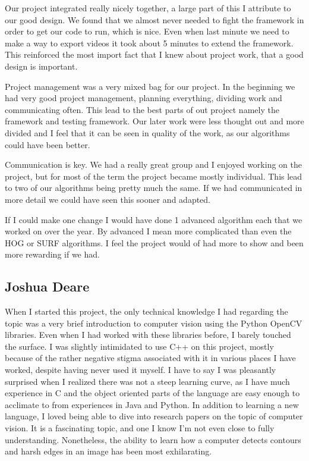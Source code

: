 \documentclass[letterpaper,10pt,titlepage]{article}
\begin{document}
Our project integrated really nicely together, a large part of this I 
attribute to our good design. We found that we almost never needed to
fight the framework in order to get our code to run, which is nice. 
Even when last minute we need to make a way to export videos it took 
about 5 minutes to extend the framework. This reinforced the most 
import fact that I knew about project work, that a good design is 
important.

Project management was a very mixed bag for our project. In the 
beginning we had very good project management, planning everything,
dividing work and communicating often. This lead to the best parts
of out project namely the framework and testing framework. Our later work
were less thought out and more divided and I feel that it can be seen in
quality of the work, as our algorithms could have been better.

Communication is key. We had a really great group and I enjoyed working on the
project, but for most of the term the project became mostly individual. This lead
to two of our algorithms being pretty much the same. If we had communicated in 
more detail we could have seen this sooner and adapted.


If I could make one change I would have done 1 advanced algorithm each that we worked on over the year.
By advanced I mean more complicated than even the HOG or SURF algorithms. I feel
the project would of had more to show and been more rewarding if we had.

\subsection*{Joshua Deare}

When I started this project, the only technical knowledge I had regarding the topic was 
a very brief introduction to computer vision using the Python OpenCV libraries.
Even when I had worked with these libraries before, I barely touched the surface. 
I was slightly intimidated to use C++ on this project, mostly because of the rather 
negative stigma associated with it in various places I have worked, despite having never used it myself.
I have to say I was pleasantly surprised when I realized there was not a steep learning curve,
as I have much experience in C and the object oriented parts of the language are easy enough to acclimate to from experiences in Java and Python.
In addition to learning a new language, I loved being able to dive into research papers on the topic of computer vision.
It is a fascinating topic, and one I know I'm not even close to fully understanding. 
Nonetheless, the ability to learn how a computer detects contours and harsh edges in an image has been most exhilarating.
\end{document}
